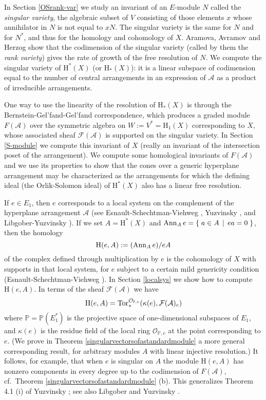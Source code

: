 \documentclass{tran-l}
\theoremstyle{definition}
\theoremstyle{remark}
\newcommand{\PP}{{\mathbb{P}}}
\newcommand{\Acal}{{{\mathcal A}}}
\newcommand{\F}{{\mathcal{F}}}
\newcommand{\Ocal}{{\mathcal{O}}}
\newcommand{\setdef}[2]{{\{\;#1\;\,|\allowbreak  \;\,#2\;\}}}
\newcommand{\ann}{\mathop{\rm Ann}\nolimits}
\newcommand{\Tor}{\mathop{\rm Tor}\nolimits}
\newcommand{\rH}{{\mathrm H}}
\begin{document}
In Section \ref{OSrank-var} we study an invariant of an $E$-module $N$ called
the {\it singular variety\/}, the algebraic subset of $V$ consisting
of those elements $x$ whose annihilator in $N$ is not equal to $xN$.
The singular variety is the same for $N$ and for $N^*$, and thus for
the homology and cohomology of $X$.  Aramova, Avramov and Herzog
\cite{AAH} show that the codimension of the singular variety (called by
them the {\it rank variety\/}) gives the rate of growth of the free
resolution of $N$.  We compute the singular variety of 
$\rH^*(X)$ (or $\rH_*(X)$): it
is a linear subspace of codimension equal to the number of central arrangements
in an expression of $\Acal$ as a product of irreducible arrangements.

One way to use the linearity of the resolution of $\rH_*(X)$ is through
the Bernstein-Gel'fand-Gel'fand correspondence, which produces a
graded module $F(\Acal)$ over the symmetric algebra on $W:=V^*=\rH_1(X)$
corresponding to $X$, whose associated sheaf $\F(\Acal)$ is supported on
the singular variety.  In Section \ref{S-module} we compute this invariant of
$X$ (really an invariant of the intersection poset of the
arrangement).  We compute some homological invariants of $F(\Acal)$ and
we use its properties to show that the cones over a generic hyperplane
arrangement may be characterized as the arrangements for which the defining
ideal (the Orlik-Solomon ideal) of $\rH^*(X)$ also has a linear free
resolution.

If $e\in E_1$, then $e$ corresponds to a local system on the complement
of the hyperplane arrangement $\Acal$ (see Esnault-Schechtman-Viehweg 
\cite{ESV},
Yuzvinsky \cite{Yu}, and Libgober-Yuzvinsky \cite[Section 4]{LY}). 
If we set $A=\rH^*(X)$ and $\ann_A e=\setdef{a\in A}{ea=0}$, 
then the homology 
\[
\rH(e, A):=(\ann_A e)/eA
\]
of the complex
defined through multiplication by $e$ is the cohomology of $X$ with
supports in that local system, for $e$ subject to a certain mild genericity  
condition (Esnault-Schechtman-Viehweg \cite{ESV}).
In Section \ref{localsys} we show how to compute $\rH(e,A)$. In terms of the sheaf
$\F(\Acal)$ we have
\[
\rH(e, A)=\Tor^{\Ocal_{\PP,e}}_*(\kappa(e),\F(\Acal)_e)
\]
where $\PP=\PP(E_1^*)$ is the projective space of one-dimensional
subspaces of $E_1$, and $\kappa(e)$ is the residue field of the local
ring $\Ocal_{\PP,e}$ at the point corresponding to $e$.  (We prove in
Theorem \ref{singularvectorsofastandardmodule} a more general 
corresponding result,
for arbitrary modules $A$ with linear injective
resolution.)  It follows, for example, that when $e$ is singular on
$A$ the module $\rH(e,A)$ has nonzero components in every degree up to
the codimension of $F(\Acal)$, 
cf.\ Theorem \ref{singularvectorsofastandardmodule} (b).  This generalizes 
Theorem 4.1 (i) of Yuzvinsky  \cite{Yu};
see also Libgober and Yuzvinsky \cite{LY}.
\end{document}
